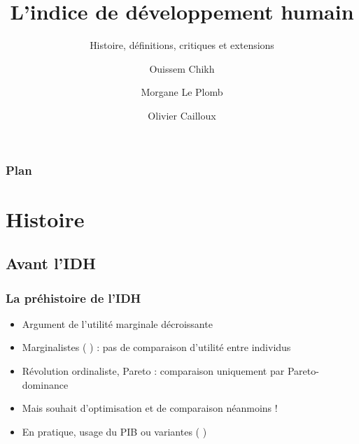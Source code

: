 \documentclass[french]{beamer}
\title[IDH]{L’indice de développement humain}
\subtitle{Histoire, définitions, critiques et extensions}
\author[Ouissem, Morgane, Olivier]{Ouissem Chikh \and Morgane Le Plomb \and Olivier Cailloux}
\institute[Éco du dev, L3]{Économie du développement, L3}
\date{\formatdate{30}{9}{2024}}
\begin{document}
\begin{frame}[plain]
	\titlepage
\end{frame}
\addtocounter{framenumber}{-1}

\begin{frame}
	\frametitle{Plan}
	\tableofcontents[hideallsubsections, sectionstyle=shaded/show]
\end{frame}


\section{Histoire}
\subsection{Avant l’IDH}
\begin{frame}
	\frametitle{La préhistoire de l’IDH}
  \begin{itemize}
    \item Argument de l’utilité marginale décroissante
    \item Marginalistes ( ) : pas de comparaison d’utilité entre individus
    \item Révolution \og{}ordinaliste\fg{}, Pareto : comparaison uniquement par Pareto-dominance
    \item Mais souhait d’optimisation et de comparaison néanmoins !
    \item En pratique, usage du PIB ou variantes ( )
  \end{itemize}
\end{frame}
\end{document}
